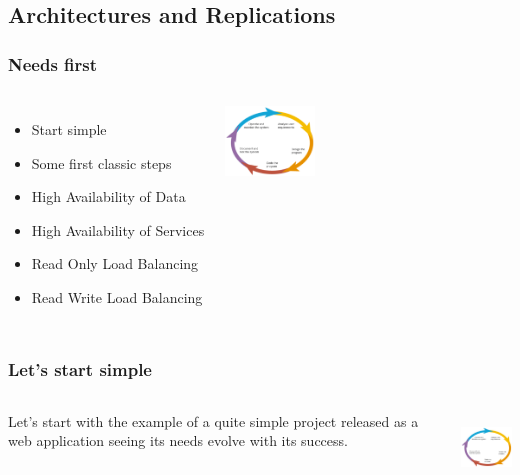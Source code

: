 \documentclass[english]{beamer}
\begin{document}
\subsection{Architectures and Replications}

\begin{frame}[fragile]
  \frametitle{Needs first}

  \vfill

\begin{columns}[c]

\begin{itemize}
  \item<1-> Start simple
  \item<1-> Some first classic steps
  \item<2-> High Availability of Data
  \item<2-> High Availability of Services
  \item<3-> Read Only Load Balancing
  \item<3-> Read Write Load Balancing
\end{itemize}

\includegraphics[height=5em]{development_life_cycle.png}
\end{columns}
\end{frame}

\begin{frame}[fragile]
  \frametitle{Let's start simple}

  \vfill

\begin{columns}[c]

  Let's start with the example of a quite simple project released as a web
  application seeing its needs evolve with its success.


\includegraphics[height=5em]{development_life_cycle.png}
\end{columns}
\end{frame}
\end{document}
